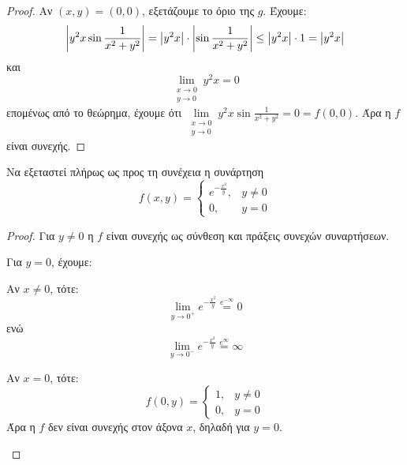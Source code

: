 \begin{examples}
\begin{enumerate}
\begin{proof}
                        Αν $ (x,y)=(0,0) $, εξετάζουμε το όριο της $g$. 
                        Έχουμε:
                        \[
                            \abs{y^{2}x \sin{\frac{1}{x^{2}+y^{2}}}} = \abs{y^{2}x}\cdot \abs{\sin{\frac{1}{x^{2}+y^{2}}}}
                            \leq \abs{y^{2}x} \cdot 1 = \abs{y^{2}x}  
                        \] 
                        και 
                        \[
                            \lim\limits_{\substack{x\to 0 \\y \to 0}} y^{2}x = 0 
                        \] 
                        επομένως από το θεώρημα, έχουμε ότι $ \lim\limits_{\substack{x\to 0 \\y \to 0}} y^{2}x
                        \sin{\frac{1}{x^{2}+y^{2}}} = 0 = f(0,0) $. Άρα η $f$ είναι συνεχής.
                    \end{proof}

                \item 

                \item Να εξεταστεί πλήρως ως προς τη συνέχεια η συνάρτηση 
                \[
                    f(x,y) = \begin{cases} e^{-\frac{x^{2}}{y}}, & y \neq 0 \\ 0, & y= 0 \end{cases}  
                 \] 
                 \begin{proof}
                 \item {}
                    Για $ y \neq 0 $ η $f$ είναι συνεχής ως σύνθεση και πράξεις συνεχών συναρτήσεων. 

                    Για $ y =0 $, έχουμε:
                    \begin{myitemize}
                    \item Αν $ x \neq 0 $, τότε:
                        \[
                            \lim_{y \to 0^{+}} e^{- \frac{x^{2}}{y}} \overset{e^{- \infty}}{=} 0 
                         \] 
                         ενώ 
                         \[
                             \lim_{y \to 0^{-}} e^{- \frac{x^{2}}{y}} \overset{e^{\infty}}{=} \infty
                          \]
                      \item Αν $ x = 0 $, τότε: 
                          \[
                              f(0,y) = \begin{cases} 1, & y \neq 0 \\ 0, & y= 0 \end{cases} 
                           \] 
                           Άρα η $f$ δεν είναι συνεχής στον άξονα $x$, δηλαδή για $ y=0 $.
                    \end{myitemize}
                 \end{proof}
                    \end{enumerate}
                        \end{examples}



